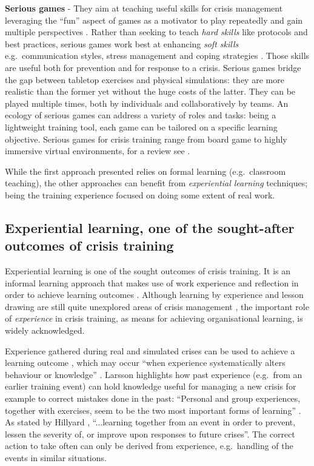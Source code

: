 \textbf{Serious games} - They aim at teaching useful skills for crisis management leveraging the ``fun'' aspect of games as a motivator to play repeatedly and gain multiple perspectives \autocite{DiLoreto:2012bj}. Rather than seeking to teach \emph{hard skills} like protocols and best practices, serious games work best at enhancing \emph{soft skills} e.g.~communication styles, stress management and coping strategies \autocite{Sagun:2009ks}. Those skills are useful both for prevention and for response to a crisis. Serious games bridge the gap between tabletop exercises and physical simulations: they are more realistic than the former yet without the huge costs of the latter. They can be played multiple times, both by individuals and collaboratively by teams. An ecology of serious games can address a variety of roles and tasks: being a lightweight training tool, each game can be tailored on a specific learning objective. Serious games for crisis training range from board game to highly immersive virtual environments, for a review see \autocite{DiLoreto:2012bj}.

While the first approach presented relies on formal learning (e.g.~classroom teaching), the other approaches can benefit from \emph{experiential learning} \autocite{kolb1984organizational} techniques; being the training experience focused on doing some extent of real work.

\subsection[Experiential learning]{Experiential learning, one of the sought-after outcomes of crisis training}\label{experiential-learning-one-of-the-sought-after-outcomes-of-crisis-training}

Experiential learning is one of the sought outcomes of crisis training. It is an informal learning approach that makes use of work experience and reflection in order to achieve learning outcomes \autocite{kolb1984organizational}. Although learning by experience and lesson drawing are still quite unexplored areas of crisis management \autocites{Lagadec:1997js}{Boin:2007wt}{Stern:1997eb}, the important role of \emph{experience} in crisis training, as means for achieving organisational learning, is widely acknowledged.

Experience gathered during real and simulated crises can be used to achieve a learning outcome \autocite{Deverell:2009fk}, which may occur ``when experience systematically alters behaviour or knowledge'' \autocite[p.233]{Schwab:2007iw}. Larsson \autocite{Larsson:2010jr} highlights how past experience (e.g.~from an earlier training event) can hold knowledge useful for managing a new crisis for example to correct mistakes done in the past: ``Personal and group experiences, together with exercises, seem to be the two most important forms of learning'' \autocite[p.714]{Larsson:2010jr}. As stated by Hillyard \autocite*{Hillyard:SYlJRQLN}, ``...learning together from an event in order to prevent, lessen the severity of, or improve upon responses to future crises''. The correct action to take often can only be derived from experience, e.g.~handling of the events in similar situations.

